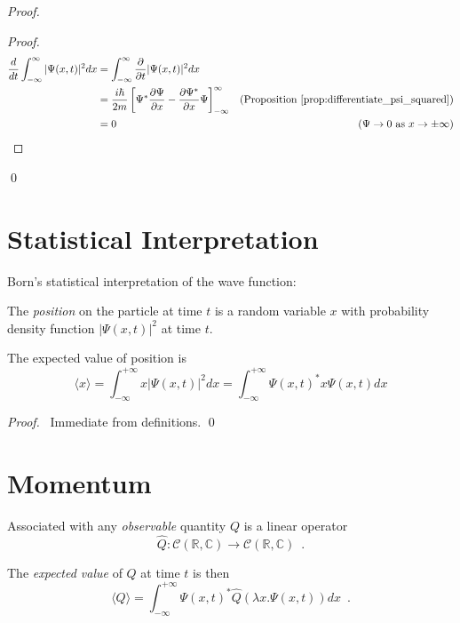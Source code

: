 \begin{proof}
\pf
{}
\begin{proof}
\pf
\begin{align*}
\frac{d}{dt} \int_{-\infty}^\infty |\Psi(x,t)|^2 dx
& = \int_{-\infty}^\infty \frac{\partial}{\partial t} |\Psi(x,t)|^2 dx \\
& = \frac{i \hbar}{2m} \left[ \Psi^* \frac{\partial \Psi}{\partial x} - \frac{\partial \Psi^*}{\partial x} \Psi \right]_{- \infty}^\infty & (\text{Proposition \ref{prop:differentiate_psi_squared}}) \\
& = 0 & (\Psi \rightarrow 0 \text{ as } x \rightarrow \pm \infty)
\end{align*}
\end{proof}
\qed
\end{proof}

\section{Statistical Interpretation}

Born's statistical interpretation of the wave function:

The \emph{position} on the particle at time $t$ is a random variable $x$ with probability density function $|\Psi(x,t)|^2$ at time $t$.

\begin{prop}
The expected value of position is
\[ \langle x \rangle = \int_{- \infty}^{+ \infty} x |\Psi(x,t)|^2 dx = \int_{-\infty}^{+ \infty} \Psi(x,t)^* x \Psi(x,t) dx \]
\end{prop}

\begin{proof}
\pf\ Immediate from definitions. \qed
\end{proof}

\section{Momentum}

Associated with any \emph{observable} quantity $Q$ is a linear operator
\[ \hat{Q} : \mathcal{C}(\mathbb{R}, \mathbb{C}) \rightarrow \mathcal{C}(\mathbb{R}, \mathbb{C}) \enspace .\]

The \emph{expected value} of $Q$ at time $t$ is then
\[ \langle Q \rangle = \int_{-\infty}^{+ \infty} \Psi(x,t)^* \hat{Q}(\lambda x. \Psi(x,t)) dx \enspace . \]


